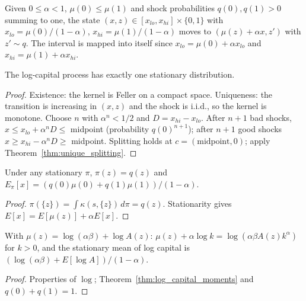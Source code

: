 \begin{definition}
\label{def:log_capital}
\leanok
Given $0\le\alpha<1$, $\mu(0)\le\mu(1)$ and shock probabilities $q(0),q(1)>0$ summing to one, the state
$(x,z)\in[x_{lo},x_{hi}]\times\{0,1\}$ with $x_{lo}=\mu(0)/(1-\alpha)$, $x_{hi}=\mu(1)/(1-\alpha)$ moves to
$(\mu(z)+\alpha x, z')$ with $z'\sim q$. The interval is mapped into itself since $x_{lo}=\mu(0)+\alpha x_{lo}$ and
$x_{hi}=\mu(1)+\alpha x_{hi}$.
\end{definition}

\begin{theorem}
\label{thm:log_capital_unique}
\leanok
{}
The log-capital process has exactly one stationary distribution.
\end{theorem}
\begin{proof}
\leanok
Existence: the kernel is Feller on a compact space. Uniqueness: the transition is increasing in $(x,z)$ and the
shock is i.i.d., so the kernel is monotone. Choose $n$ with $\alpha^n<1/2$ and $D=x_{hi}-x_{lo}$. After $n+1$ bad
shocks, $x\le x_{lo}+\alpha^nD\le$ midpoint (probability $q(0)^{n+1}$); after $n+1$ good shocks
$x\ge x_{hi}-\alpha^nD\ge$ midpoint. Splitting holds at $c=(\text{midpoint},0)$; apply
Theorem~\ref{thm:unique_splitting}.
\end{proof}

\begin{theorem}
\label{thm:log_capital_moments}
\leanok
{}
Under any stationary $\pi$, $\pi(z)=q(z)$ and $E_\pi[x]=(q(0)\mu(0)+q(1)\mu(1))/(1-\alpha)$.
\end{theorem}
\begin{proof}
\leanok
$\pi(\{z\})=\int\kappa(s,\{z\})\,d\pi=q(z)$. Stationarity gives $E[x]=E[\mu(z)]+\alpha E[x]$.
\end{proof}

\begin{theorem}
\label{thm:brock_mirman_stochastic}
\leanok
{}
With $\mu(z)=\log(\alpha\beta)+\log A(z)$: $\mu(z)+\alpha\log k=\log(\alpha\beta A(z)k^\alpha)$ for $k>0$, and the
stationary mean of log capital is $(\log(\alpha\beta)+E[\log A])/(1-\alpha)$.
\end{theorem}
\begin{proof}
\leanok
Properties of $\log$; Theorem~\ref{thm:log_capital_moments} and $q(0)+q(1)=1$.
\end{proof}

